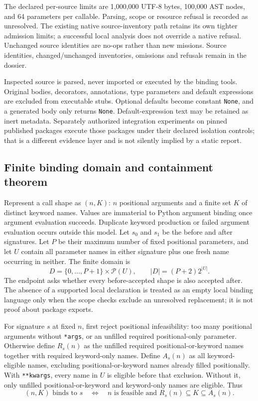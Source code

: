 \documentclass[11pt,letterpaper]{article}
\begin{document}
The declared per-source limits are 1,000,000 UTF-8 bytes, 100,000 AST nodes,
and 64 parameters per callable. Parsing, scope or resource refusal is recorded
as unresolved. The existing native source-inventory path retains its own
tighter admission limits; a successful local analysis does not override a
native refusal. Unchanged source identities are no-ops rather than new
missions. Source identities, changed/unchanged inventories, omissions and
refusals remain in the dossier.

Inspected source is parsed, never imported or executed by the binding tools.
Original bodies, decorators, annotations, type parameters and default
expressions are excluded from executable stubs. Optional defaults become
constant \texttt{None}, and a generated body only returns \texttt{None}.
Default-expression text may be retained as inert metadata. Separately
authorized integration experiments on pinned published packages execute
those packages under their declared isolation controls; that is a different
evidence layer and is not silently implied by a static report.

\subsection{Finite binding domain and containment theorem}

Represent a call shape as $(n,K)$: $n$ positional arguments and a finite set
$K$ of distinct keyword names. Values are immaterial to Python argument
binding once argument evaluation succeeds. Duplicate keyword production or
failed argument evaluation occurs outside this model.
Let $s_0$ and $s_1$ be the before and after signatures. Let $P$ be their maximum
number of fixed positional parameters, and let $U$ contain all parameter
names in either signature plus one fresh name occurring in neither.
The finite domain is
\[
  D = \{0,\ldots,P+1\}\times\mathcal{P}(U),
  \qquad |D|=(P+2)2^{|U|}.
\]
The endpoint asks whether every before-accepted shape is also accepted after.
The absence of a supported local declaration is treated as an empty local
binding language only when the scope checks exclude an unresolved
replacement; it is not proof about package exports.

For signature $s$ at fixed $n$, first reject positional infeasibility: too
many positional arguments without \texttt{*args}, or an unfilled required
positional-only parameter. Otherwise define $R_s(n)$ as the unfilled required
positional-or-keyword names together with required keyword-only names.
Define $A_s(n)$ as all keyword-eligible names, excluding
positional-or-keyword names already filled positionally. With
\texttt{**kwargs}, every name in $U$ is eligible before that exclusion.
Without it, only unfilled positional-or-keyword and keyword-only names are
eligible. Thus
\[
 (n,K)\text{ binds to }s
 \quad\Longleftrightarrow\quad
 n\text{ is feasible and }R_s(n)\subseteq K\subseteq A_s(n).
\]
\end{document}
